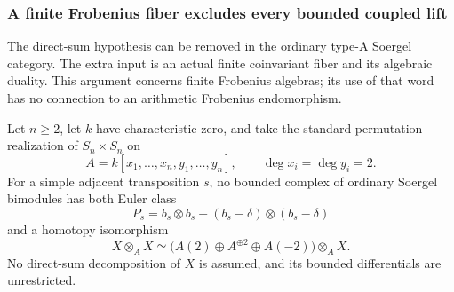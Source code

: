 \subsubsection{A finite Frobenius fiber excludes every bounded coupled lift}

The direct-sum hypothesis can be removed in the ordinary type-A
Soergel category. The extra input is an actual finite coinvariant
fiber and its algebraic duality. This argument concerns finite
Frobenius algebras; its use of that word has no connection to an
arithmetic Frobenius endomorphism.

\begin{finding}
\label{f:boundedSoergelNoGo}
Let \(n\ge2\), let \(k\) have characteristic zero, and take the
standard permutation realization of \(S_n\times S_n\) on
\[
 A=k[x_1,\ldots,x_n,y_1,\ldots,y_n],
 \qquad \deg x_i=\deg y_i=2.
\]
For a simple adjacent transposition \(s\), no bounded complex of
ordinary Soergel bimodules has both Euler class
\[
 P_s=b_s\otimes b_s+(b_s-\delta)\otimes(b_s-\delta)
\]
and a homotopy isomorphism
\begin{equation}\label{eq:boundedSoergelquadratic}
 X\otimes_A X\simeq
 \bigl(A(2)\oplus A^{\oplus2}\oplus A(-2)\bigr)\otimes_A X.
\end{equation}
No direct-sum decomposition of \(X\) is assumed, and its bounded
differentials are unrestricted.
\end{finding}

